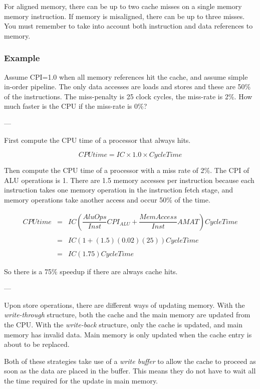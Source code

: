 \documentclass{article}
\begin{document}
For aligned memory, there can be up to two cache misses on a single memory memory instruction. If memory is misaligned, there can be up to three misses. You must remember to take into account both instruction and data references to memory.

\subsubsection*{Example}

Assume CPI=1.0 when all memory references hit the cache, and assume simple in-order pipeline. The only data accesses are loads and stores and these are 50\% of the instructions. The miss-penalty is 25 clock cycles, the miss-rate is 2\%. How much faster is the CPU if the miss-rate is 0\%?

---

First compute the CPU time of a processor that always hits.

$$CPUtime = IC \times 1.0 \times CycleTime$$

Then compute the CPU time of a processor with a miss rate of 2\%. The CPI of ALU operations is 1. There are 1.5 memory accesses per instruction because each instruction takes one memory operation in the instruction fetch stage, and memory operations take another access and occur 50\% of the time.

\begin{equation}
\begin{array}{rcl}
CPUtime & = & IC \left(\dfrac{AluOps}{Inst} CPI_{ALU} + \dfrac{MemAccess}{Inst} AMAT \right) CycleTime  \\
\\
& = & IC \left( 1 + (1.5)(0.02)(25) \right) CycleTime \\ 
\\
& = & IC \left( 1.75 \right) CycleTime 
\end{array}
\end{equation}

So there is a 75\% speedup if there are always cache hits.

---

Upon store operations, there are different ways of updating memory. With the \textit{write-through} structure, both the cache and the main memory are updated from the CPU. With the \textit{write-back} structure, only the cache is updated, and main memory has invalid data. Main memory is only updated when the cache entry is about to be replaced.

Both of these strategies take use of a \textit{write buffer} to allow the cache to proceed as soon as the data are placed in the buffer. This means they do not have to wait all the time required for the update in main memory.
\end{document}
